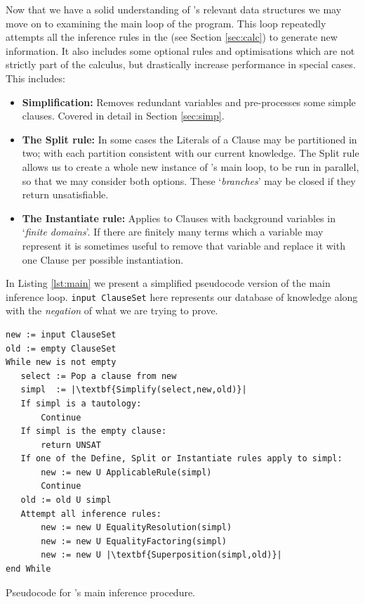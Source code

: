 Now that we have a solid understanding of \beagle's relevant data structures
we may move on to examining the main loop of the program. This loop repeatedly
attempts all the inference rules in the {\HSWAC} (see Section \ref{sec:calc})
to generate new information. It also includes some optional rules and optimisations
which are not strictly part of the calculus, but drastically increase performance
in special cases. This includes:
\begin{itemize}
\item \textbf{Simplification:} Removes redundant variables and pre-processes some simple clauses.
Covered in detail in Section \ref{sec:simp}.
\item \textbf{The Split rule:} In some cases the Literals of a Clause may be partitioned
in two; with each partition consistent with our current knowledge. The Split rule allows
us to create a whole new instance of \beagle's main loop, to be run in parallel,
so that we may consider both options. These `\emph{branches}' may be closed if they return
unsatisfiable.
\item \textbf{The Instantiate rule:} Applies to Clauses with background variables in `\emph{finite domains}'.
If there are finitely many terms which a variable may represent it is sometimes useful
to remove that variable and replace it with one Clause per possible instantiation.
\end{itemize}

In Listing \ref{lst:main} we present a simplified pseudocode version of the main inference loop.
\verb!input ClauseSet! here represents our database of knowledge along with
the \emph{negation} of what we are trying to prove.
\begin{listing}[H]
\begin{lstlisting}
new := input ClauseSet
old := empty ClauseSet
While new is not empty
   select := Pop a clause from new
   simpl  := |\textbf{Simplify(select,new,old)}|
   If simpl is a tautology:
       Continue
   If simpl is the empty clause:
       return UNSAT
   If one of the Define, Split or Instantiate rules apply to simpl:
       new := new U ApplicableRule(simpl)
       Continue
   old := old U simpl
   Attempt all inference rules:
       new := new U EqualityResolution(simpl)
       new := new U EqualityFactoring(simpl)
       new := new U |\textbf{Superposition(simpl,old)}|
end While
\end{lstlisting}
\caption{Pseudocode for \beagle's main inference procedure.}
\label{lst:main}
\end{listing}

